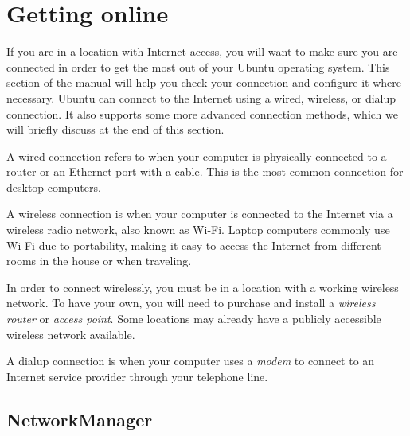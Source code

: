 \section{Getting online}

If you are in a location with Internet access, you will want to make sure you are connected in order to get the most out of your Ubuntu operating system. This section of the manual will help you check your connection and configure it where necessary. Ubuntu can connect to the Internet using a wired, wireless, or dialup connection. It also supports some more advanced connection methods, which we will briefly discuss at the end of this section. 

\begin{comment}
This margin note is confusing to me - are you saying that to connect to a network (\ie, access files from my home computer with my laptop) I do the same thing as connecting to the Internet? This is not the case and will probably confuse people so have removed it for now.
\marginnote{In this guide we will limit our discussion to connecting to the Internet. However, connecting to a home or office network is usually performed in a similar manner.}
\end{comment}

A \gls{wired connection} refers to when your computer is physically 
connected to a \gls{router} or an \gls{Ethernet port} with a cable. This is 
the most common connection for desktop computers. 

A \gls{wireless connection} is when your computer is connected to the Internet via a wireless radio network, also known as Wi-Fi. Laptop computers commonly use Wi-Fi due to portability, making it easy to access the Internet from different rooms in the house or when traveling.

In order to connect wirelessly, you must be in a location with a working wireless network. To have your own, you will need to purchase and install a \emph{wireless router} or \emph{access point}. Some locations may already have a publicly accessible wireless network available.

A \gls{dialup connection} is when your computer uses a 
\emph{modem} to connect to an Internet service provider through your telephone line.

\subsection{NetworkManager}

